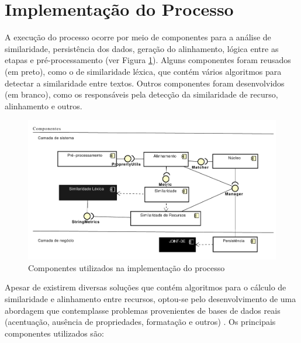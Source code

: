 \section{Implementação do Processo}
\label{sec:componentes}
A execução do processo ocorre por meio de componentes para a análise de similaridade, persistência dos dados, geração do alinhamento, lógica entre as etapas e pré-processamento (ver Figura \ref{fig:componentes}). Alguns componentes foram reusados (em preto), como o de similaridade léxica, que contém vários algoritmos para detectar a similaridade entre textos. Outros componentes foram desenvolvidos (em branco), como os responsáveis pela detecção da similaridade de recurso, alinhamento e outros.
% 
% 
%
%

\begin{figure}[!ht]
	\centering
	\includegraphics[width=1\textwidth]{./imagens/componentes.pdf}
    \caption{Componentes utilizados na implementação do processo}
	\label{fig:componentes}
\end{figure}

Apesar de existirem diversas soluções que contém algoritmos para o cálculo de similaridade e alinhamento entre recursos, optou-se pelo desenvolvimento de uma abordagem que contemplasse problemas provenientes de bases de dados reais (acentuação, ausência de propriedades, formatação e outros) \cite{castano2011ontology,ferrara2008towards}.
Os principais componentes utilizados são:


